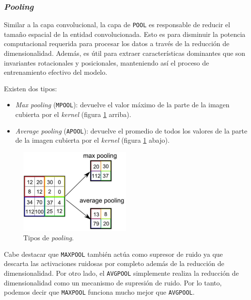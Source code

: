 \documentclass[a4paper,12pt]{article}
\begin{document}
\subsubsection{\textit{Pooling}}

Similar a la capa convolucional, la capa de \texttt{POOL} es responsable de reducir el tamaño espacial de la entidad convolucionada. Esto es para disminuir la potencia computacional requerida para procesar los datos a través de la reducción de dimensionalidad. Además, es útil para extraer características dominantes que son invariantes rotacionales y posicionales, manteniendo así el proceso de entrenamiento efectivo del modelo.

Existen dos tipos:
\begin{itemize}[noitemsep, topsep=2pt]
	\item \textit{Max pooling} (\texttt{MPOOL}): devuelve el valor máximo de la parte de la imagen cubierta por el \textit{kernel} (figura \ref{fig:type-pooling} arriba).
	\item \textit{Average pooling} (\texttt{APOOL}): devuelve el promedio de todos los valores de la parte de la imagen cubierta por el \textit{kernel} (figura \ref{fig:type-pooling} abajo).
\end{itemize}

\begin{figure}[H]
	\begin{center}				
	\includegraphics[width=0.5\textwidth]{tesis_45.png}
  	\caption{Tipos de \textit{pooling}.}
  	\label{fig:type-pooling}
  	\end{center}
\end{figure}

Cabe destacar que \texttt{MAXPOOL} también actúa como supresor de ruido ya que descarta las activaciones ruidosas por completo además de la reducción de dimensionalidad. Por otro lado, el \texttt{AVGPOOL} simplemente realiza la reducción de dimensionalidad como un mecanismo de supresión de ruido. Por lo tanto, podemos decir que \texttt{MAXPOOL} funciona mucho mejor que \texttt{AVGPOOL}.
\end{document}
